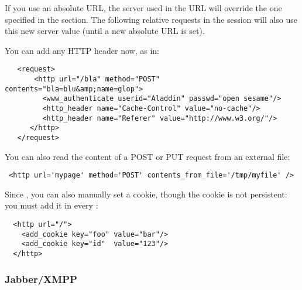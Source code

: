\documentclass{TSUNG-en}
\begin{document}
If you use an absolute URL, the server used in the URL will override
the one specified in the  section. The following relative
requests in the session will also use this new server value (until a
new absolute URL is set).

 You can add any HTTP header now, as in:
\begin{Verbatim}
   <request>
       <http url="/bla" method="POST" contents="bla=blu&amp;name=glop">
         <www_authenticate userid="Aladdin" passwd="open sesame"/>
         <http_header name="Cache-Control" value="no-cache"/>
         <http_header name="Referer" value="http://www.w3.org/"/>
      </http>
   </request>
\end{Verbatim}

 You can also read the content of a POST or PUT
request from an external file:

\begin{Verbatim}
 <http url='mypage' method='POST' contents_from_file='/tmp/myfile' />
\end{Verbatim}

Since , you can also manually set a cookie, though the
cookie is not persistent: you must add it in every :
\begin{Verbatim}
  <http url="/">
    <add_cookie key="foo" value="bar"/>
    <add_cookie key="id"  value="123"/>
  </http>
\end{Verbatim}

\subsubsection{Jabber/XMPP}
\end{document}
